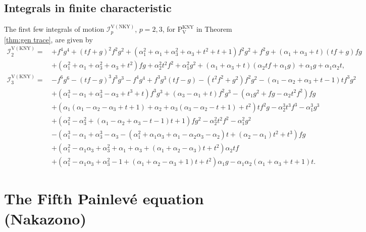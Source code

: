 \documentclass[a4paper,reqno]{amsart}
\numberwithin{equation}{section}
\numberwithin{figure}{section}
\theoremstyle{remark}
\newcommand\Pfive{\textrm{P}_{\textrm{V}}}
\begin{document}
\subsection{Integrals in finite characteristic}
The first few integrals of motion $\mathcal{I}_p^{\textrm{V}(\text{NKY})}$, $p=2,3$, for $\Pfive^\text{KNY}$ in Theorem \ref{thm:gen trace}, are given by
\begin{align*}
    \mathcal{I}_2^{\textrm{V}(\text{KNY})}=\,&+f^4 g^4+(t f+g)^2f^2 g^2 + (\alpha_1^2+\alpha_1+\alpha_3^2+\alpha_3+t^2+t+1)f^2 g^2+f^2g+(\alpha_1+\alpha_3+t)(tf+g)fg\\
    &+(\alpha_1^2+\alpha_1+\alpha_3^2+\alpha_3+t^2)fg+\alpha_2^2 t^2 f^2+\alpha_1^2 g^2+(\alpha_1+\alpha_3+t)(\alpha_2 t f+\alpha_1 g)+\alpha_1 g+\alpha_1 \alpha_2 t,\\
   \mathcal{I}_3^{\textrm{V}(\text{KNY})}=\, &-f^6g^6- (t f-g)^3f^3 g^3-f^4 g^4+f^3 g^3 (t f-g)-(t^2 f^2+g^2)f^2 g^2-(\alpha_1-\alpha_2+\alpha_3+t-1)t f^3 g^2\\
   &+(\alpha_1^3-\alpha_1+\alpha_3^3-\alpha_3+t^3+t)f^3 g^3+(\alpha_3-\alpha_1+t) f^2 g^3-(\alpha_1 g^2+f g-\alpha_2 t^2 f^2)f g\\
   &+(\alpha_1(\alpha_1-\alpha_2-\alpha_3+t+1)+\alpha_2+\alpha_3(\alpha_3-\alpha_2-t+1)+t^2)t f^2 g- \alpha_2^3 t^3 f^3- \alpha_1^3 g^3\\
   & +(\alpha_1^2-\alpha_3^2
   +(\alpha_1-\alpha_2+\alpha_3-t-1)t+1)f g^2-\alpha_2^2 t^2 f^2-\alpha_1^2 g^2\\
   &-(\alpha_1^3-\alpha_1+\alpha_3^3-\alpha_3-(\alpha_1^2+\alpha_1 \alpha_3+ \alpha_1-\alpha_2 \alpha_3-\alpha_2)t+ (\alpha_2-\alpha_1)t^2+t^3)f g \\
   &+(\alpha_1^2- \alpha_1 \alpha_3+\alpha_3^2+\alpha_1+\alpha_3+ (\alpha_1+\alpha_2-\alpha_3)t+t^2)\alpha_2tf\\
   &+(\alpha_1^2-\alpha_1 \alpha_3+\alpha_3^2-1+(\alpha_1+\alpha_2-\alpha_3+1)t+t^2)\alpha_1g-\alpha_1 \alpha_2(\alpha_1+\alpha_3+t+1)t.
\end{align*}














\section{The Fifth Painlev\'e equation (Nakazono)}\label{sect:p5Na}
\end{document}
